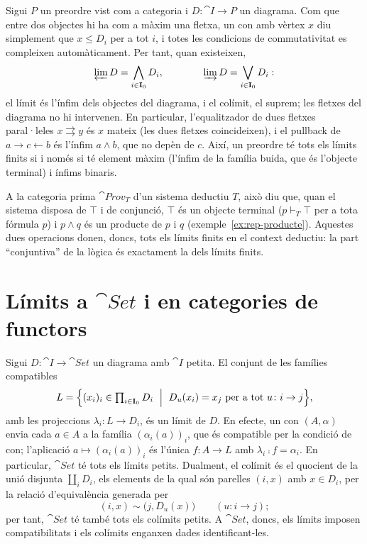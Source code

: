 \begin{exemple}\label{ex:limits-preordre}
Sigui $P$ un preordre vist com a categoria i $D\colon\cat{I}\to P$ un diagrama. Com que entre dos objectes hi ha com a màxim una fletxa, un con amb vèrtex $x$ diu simplement que $x\le D_i$ per a tot $i$, i totes les condicions de commutativitat es compleixen automàticament. Per tant, quan existeixen,
\[
\varprojlim D=\bigwedge_{i\in\mathbf{I}_0}D_i,
\qquad\qquad
\varinjlim D=\bigvee_{i\in\mathbf{I}_0}D_i:
\]
el límit és l'ínfim dels objectes del diagrama, i el colímit, el suprem; les fletxes del diagrama no hi intervenen. En particular, l'equalitzador de dues fletxes paral·leles $x\rightrightarrows y$ és $x$ mateix (les dues fletxes coincideixen), i el pullback de $a\to c\leftarrow b$ és l'ínfim $a\wedge b$, que no depèn de $c$. Així, un preordre té tots els límits finits si i només si té element màxim (l'ínfim de la família buida, que és l'objecte terminal) i ínfims binaris.

A la categoria prima $\cat{Prov}_T$ d'un sistema deductiu $T$, això diu que, quan el sistema disposa de $\top$ i de conjunció, $\top$ és un objecte terminal ($p\vdash_T\top$ per a tota fórmula $p$) i $p\land q$ és un producte de $p$ i $q$ (exemple~\ref{ex:rep-producte}). Aquestes dues operacions donen, doncs, tots els límits finits en el context deductiu: la part \enquote{conjuntiva} de la lògica és exactament la dels límits finits.
\end{exemple}

\section{Límits a \texorpdfstring{$\cat{Set}$}{Set} i en categories de functors}

\begin{exemple}\label{ex:limits-set}
Sigui $D\colon\cat{I}\to\cat{Set}$ un diagrama amb $\cat{I}$ petita. El conjunt de les famílies compatibles
\[
L=\Bigl\{(x_i)_{i}\in\textstyle\prod_{i\in\cat{I}_0}D_i\ \Bigm|\ D_u(x_i)=x_j\ \text{per a tot } u\colon i\to j\Bigr\},
\]
amb les projeccions $\lambda_i\colon L\to D_i$, és un límit de $D$. En efecte, un con $(A,\alpha)$ envia cada $a\in A$ a la família $(\alpha_i(a))_i$, que és compatible per la condició de con; l'aplicació $a\mapsto(\alpha_i(a))_i$ és l'única $f\colon A\to L$ amb $\lambda_i\comp f=\alpha_i$. En particular, $\cat{Set}$ té tots els límits petits. Dualment, el colímit és el quocient de la unió disjunta $\coprod_i D_i$, els elements de la qual són parelles $(i,x)$ amb $x\in D_i$, per la relació d'equivalència generada per
\[
(i,x)\sim\bigl(j,D_u(x)\bigr)\qquad(u\colon i\to j);
\]
per tant, $\cat{Set}$ té també tots els colímits petits. A $\cat{Set}$, doncs, els límits imposen compatibilitats i els colímits enganxen dades identificant-les.
\end{exemple}

